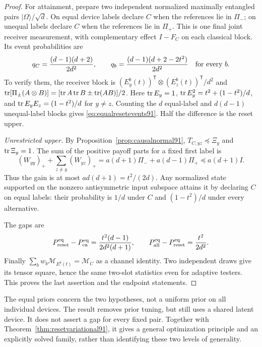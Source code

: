 \begin{proof}
For attainment, prepare two independent normalized maximally entangled
pairs $|\Omega\rangle/\sqrt d$.  On equal device labels declare $C$
when the references lie in $\Pi_-$; on unequal labels declare $C$
when the references lie in $\Pi_+$.  This is one final joint receiver
measurement, with complementary effect $I-F_C$ on each classical
block.  Its event probabilities are
\begin{equation}\label{eq:equalresetevents91}
 q_C=\frac{(d-1)(d+2)}{2d^2},\qquad
 q_b=\frac{(d-1)(d+2-2t^2)}{2d^2}
 \quad\hbox{for every }b.
\end{equation}
To verify them, the receiver block is
$(E_y^b(t))^{\mathsf T}\otimes(E_z^b(t))^{\mathsf T}/d^2$ and
$\operatorname{tr}[\Pi_\pm(A\otimes B)]=[\operatorname{tr} A\operatorname{tr} B\pm\operatorname{tr}(AB)]/2$.
Here $\operatorname{tr} E_y=1$,
$\operatorname{tr} E_y^2=t^2+(1-t^2)/d$, and
$\operatorname{tr} E_yE_z=(1-t^2)/d$ for $y\ne z$.
Counting the $d$ equal-label and $d(d-1)$ unequal-label blocks gives
\eqref{eq:equalresetevents91}.  Half the difference is the reset upper.

\emph{Unrestricted upper.}
By Proposition~\ref{prop:causalnormal91}, $T_{C,yz}\preceq\Xi_y$
and $\operatorname{tr}\Xi_y=1$.  The sum of the positive payoff parts for a fixed
first label is
\[
 (W_{yy})_++\sum_{z\ne y}(W_{yz})_+
 =a(d+1)\Pi_-+a(d-1)\Pi_+\preceq a(d+1)I.
\]
Thus the gain is at most $ad(d+1)=t^2/(2d)$.
Any normalized state supported on the nonzero antisymmetric input
subspace attains it by declaring $C$ on equal labels: their probability
is $1/d$ under $C$ and $(1-t^2)/d$ under every alternative.

The gaps are
\begin{equation}\label{eq:equalgaps91}
 P_{\rm reset}^{\rm eq}-P_{\rm ca}^{\rm eq}
 =\frac{t^2(d-1)}{2d^2(d+1)},\qquad
 P_{\rm all}^{\rm eq}-P_{\rm reset}^{\rm eq}
 =\frac{t^2}{2d^2}.
\end{equation}
Finally $\sum_bw_b\mathcal M_{E^b(t)}=\mathcal M_C$ as a channel
identity.  Two independent draws give its tensor square, hence the
same two-slot statistics even for adaptive testers.  This proves the
last assertion and the endpoint statements.
\end{proof}
The equal priors concern the two hypotheses, not a uniform prior on all
individual devices.  The result removes prior tuning, but still uses
a shared latent device.  It does not assert a gap for every fixed pair.
Together with Theorem~\ref{thm:resetvariational91}, it gives a general
optimization principle and an explicitly solved family, rather than
identifying these two levels of generality.

